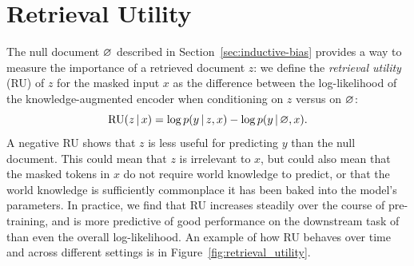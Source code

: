 \documentclass{article}
\begin{document}
\section{Retrieval Utility}
The null document $\varnothing$ described in Section~\ref{sec:inductive-bias}
provides a way to measure the importance of a retrieved document $z$: we define the \emph{retrieval utility} (RU) of $z$ for the masked input $x$ as
the difference between the log-likelihood of the knowledge-augmented encoder when conditioning on $z$ versus on $\varnothing$:
\begin{equation}
\text{RU}(z \,|\, x) = \log p(y \,|\, z, x) - \log p(y \,|\, \varnothing, x). 
\label{eq:retrieval_utility}
\end{equation}
A negative RU shows that $z$ is less useful for predicting $y$ than the null document. This could mean that $z$ is irrelevant to $x$, but could also mean that the masked tokens in $x$ do not require world knowledge to predict, or that the world knowledge is sufficiently commonplace it has been baked into the model's parameters. In practice, we find that RU increases steadily over the course of pre-training, and is more predictive of good performance on the downstream task of \openqa than even the overall log-likelihood. An example of how RU behaves over time and across different settings is in Figure~\ref{fig:retrieval_utility}.
\end{document}
